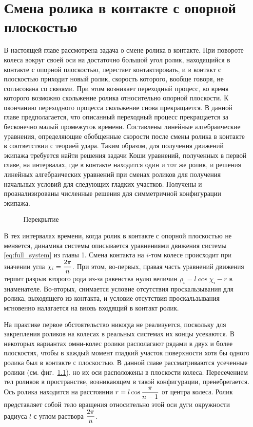 \chapter{Смена ролика в контакте с опорной плоскостью}


В настоящей главе рассмотрена задача о смене ролика в контакте. При повороте колеса вокруг своей оси на достаточно большой угол ролик, находящийся в контакте с опорной плоскостью, перестает контактировать, и в контакт с плоскостью приходит новый ролик, скорость которого, вообще говоря, не согласована со связями. При этом возникает переходный процесс, во время которого возможно скольжение ролика относительно опорной плоскости. К окончанию переходного процесса скольжение снова прекращается. В данной главе предполагается, что описанный переходный процесс прекращается за бесконечно малый промежуток времени. Составлены линейные алгебраические уравнения, определяющие обобщенные скорости после смены ролика в контакте в соответствии с теорией удара. Таким образом, для получения движений экипажа требуется найти решения задачи Коши уравнений, полученных в первой главе, на интервалах, где в контакте находится один и тот же ролик, и решения линейных алгебраических уравнений при сменах роликов для получения начальных условий для следующих гладких участков. Получены и проанализированы численные решения для симметричной конфигурации экипажа.

\begin{figure}
    \minipage{\textwidth}
        \centering
        \caption{Перекрытие}
        \label{fig:overlap}
    \endminipage
\end{figure}

В тех интервалах времени, когда ролик в контакте с опорной плоскостью не меняется, динамика системы описывается уравнениями движения системы \ref{eq:full_system} из главы 1. Смена контакта на $i$-том колесе происходит при значении угла $\chi_i = \displaystyle\frac{\displaystyle 2\pi}{\displaystyle n}$. При этом, во-первых, правая часть уравнений движения терпит разрыв второго рода из-за равенства нулю величин $\rho_i = l\cos\chi_i-r$ в знаменателе. Во-вторых, снимается условие отсутствия проскальзывания для ролика, выходящего из контакта, и условие отсутствия проскальзывания мгновенно налагается на вновь входящий в контакт ролик.

На практике первое обстоятельство никогда не реализуется, поскольку для закрепления роликов на колесах в реальных системах их концы усекаются. В некоторых вариантах омни-колес ролики располагают рядами в двух и более плоскостях, чтобы в каждый момент гладкий участок поверхности хотя бы одного ролика был в контакте с плоскостью. В данной главе рассматриваются усеченные ролики (см. фиг.~\ref{fig:overlap}), но их оси расположены в плоскости колеса. Пересечением тел роликов в пространстве, возникающем в такой конфигурации, пренебрегается. Ось ролика находится на расстоянии $r = l\cos\displaystyle\frac{\displaystyle \pi}{\displaystyle n-1}$ от центра колеса. Ролик представляет собой тело вращения относительно этой оси дуги окружности радиуса $l$ с углом раствора $\displaystyle\frac{\displaystyle 2\pi}{\displaystyle n}$.

